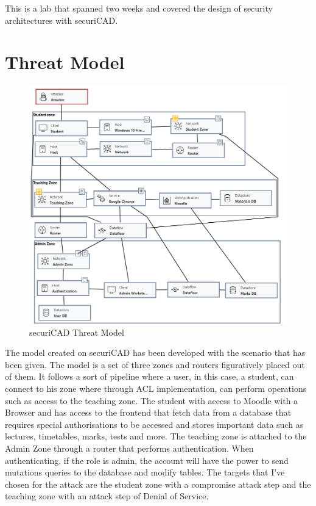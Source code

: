 This is a lab that spanned two weeks and covered the design of security
architectures with securiCAD.

\section{Threat Model}
\label{s:threat-model}

\begin{figure}[H]
  \centering
  \includegraphics[width=1\textwidth]{figures/securiCAD}
  \caption{securiCAD Threat Model}
  \label{f:securiCAD-Model}
\end{figure}

The model created on securiCAD has been developed with the scenario that has
been given. The model is a set of three zones and routers figuratively placed
out of them. It follows a sort of pipeline where a user, in this case, a student,
can connect to his zone where through ACL implementation, can perform
operations such as access to the teaching zone. The student with access to
Moodle with a Browser and has access to the frontend that fetch data from a
database that requires special authorisations to be accessed and stores
important data such as lectures, timetables, marks, tests and more. The teaching
zone is attached to the Admin Zone through a router that performs authentication.
When authenticating, if the role is admin, the account will have the power to
send mutations queries to the database and modify tables.
The targets that I've chosen for the attack are the student zone with a
compromise attack step and the teaching zone with an attack step of Denial of
Service.


